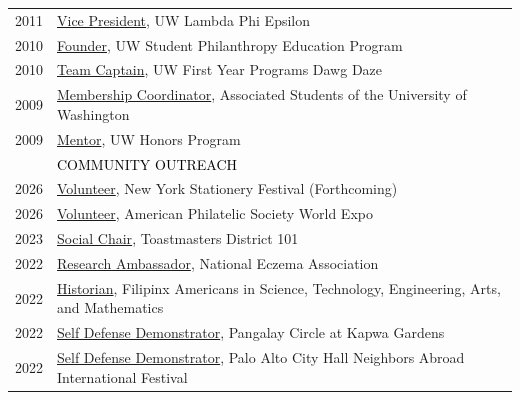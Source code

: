 \documentclass[12pt]{article}
\begin{document}
{\begin{longtable}{R{0.75in}p{5.0in}}
\footnotesize{2011} & \href{https://www.dailyuw.com/features/article_107d7a3a-3bec-5989-b8ae-56bd4afd0c89.html}{Vice President}, UW Lambda Phi Epsilon\\

\footnotesize{2010} & \href{https://www.facebook.com/spepatuw/}{Founder}, UW Student Philanthropy Education Program\\

\footnotesize{2010} & \href{https://dawgdaze.fyp.uw.edu/}{Team Captain}, UW First Year Programs Dawg Daze\\

\footnotesize{2009} & \href{https://www.dailyuw.com/news/article_05df45ba-6f0b-5612-964e-ab318f36b612.html}{Membership Coordinator}, Associated Students of the University of Washington\\

\footnotesize{2009} & \href{https://web.archive.org/web/20251118013937/https://honors.uw.edu/community/grads/12_13/}{Mentor}, UW Honors Program \medskip \\

& \large \textcolor{black}{\uppercase{Community Outreach}}\\

\footnotesize{2026} & \href{https://stationeryfestival.com/}{Volunteer}, New York Stationery Festival (Forthcoming)\\

\footnotesize{2026} & \href{https://boston2026.com/}{Volunteer}, American Philatelic Society World Expo\\

\footnotesize{2023} & \href{https://web.archive.org/web/20240304010059/https://d101tm.org/district-101/2023-24-pr-team/}{Social Chair}, Toastmasters District 101\\

\footnotesize{2022} & \href{https://nationaleczema.org/research-ambassadors/}{Research Ambassador}, National Eczema Association\\

\footnotesize{2022} & \href{https://faster-steam.org/}{Historian}, Filipinx Americans in Science, Technology, Engineering, Arts, and Mathematics\\

\footnotesize{2022} & \href{https://www.instagram.com/p/CjoCaCQv9OS/}{Self Defense Demonstrator}, Pangalay Circle at Kapwa Gardens\\

\footnotesize{2022} & \href{https://www.paloaltoonline.com/news/2022/08/23/nonprofit-neighbors-abroad-to-host-international-festival-unveil-new-sign}{Self Defense Demonstrator}, Palo Alto City Hall Neighbors Abroad International Festival\\


\end{longtable}}
\end{document}
